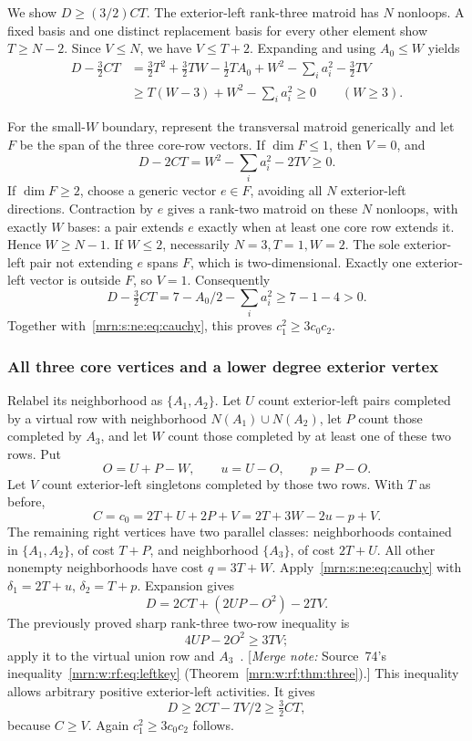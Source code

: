 \documentclass[11pt,a4paper]{article}
\theoremstyle{remark}\newtheorem{remark}[theorem]{Remark}
\newcommand{\mnote}[1]{[\textit{Merge note:} #1]}
\begin{document}
We show $D\ge(3/2)CT$. The exterior-left rank-three matroid has $N$ nonloops. A fixed basis and one distinct replacement basis for every other element show $T\ge N-2$. Since $V\le N$, we have $V\le T+2$. Expanding and using $A_0\le W$ yields
\begin{align*}
 D-\tfrac32CT
 &=\tfrac32T^2+\tfrac32TW-\tfrac12TA_0
   +W^2-\sum_i a_i^2-\tfrac32TV\\
 &\ge T(W-3)+W^2-\sum_i a_i^2\ge0
 \qquad(W\ge3).
\end{align*}

For the small-$W$ boundary, represent the transversal matroid generically and let $F$ be the span of the three core-row vectors. If $\dim F\le1$, then $V=0$, and
\[
 D-2CT=W^2-\sum_i a_i^2-2TV\ge0.
\]
If $\dim F\ge2$, choose a generic vector $e\in F$, avoiding all $N$ exterior-left directions. Contraction by $e$ gives a rank-two matroid on these $N$ nonloops, with exactly $W$ bases: a pair extends $e$ exactly when at least one core row extends it. Hence $W\ge N-1$. If $W\le2$, necessarily $N=3,T=1,W=2$. The sole exterior-left pair not extending $e$ spans $F$, which is two-dimensional. Exactly one exterior-left vector is outside $F$, so $V=1$. Consequently
\[
 D-\tfrac32CT=7-A_0/2-\sum_i a_i^2\ge7-1-4>0.
\]
Together with~\eqref{mrn:s:ne:eq:cauchy}, this proves $c_1^2\ge3c_0c_2$.

\subsubsection{All three core vertices and a lower degree exterior vertex}
Relabel its neighborhood as $\{A_1,A_2\}$. Let $U$ count exterior-left pairs completed by a virtual row with neighborhood $N(A_1)\cup N(A_2)$, let $P$ count those completed by $A_3$, and let $W$ count those completed by at least one of these two rows. Put
\[
 O=U+P-W,\qquad u=U-O,\qquad p=P-O.
\]
Let $V$ count exterior-left singletons completed by those two rows. With $T$ as before,
\[
 C=c_0=2T+U+2P+V=2T+3W-2u-p+V.
\]
The remaining right vertices have two parallel classes: neighborhoods contained in $\{A_1,A_2\}$, of cost $T+P$, and neighborhood $\{A_3\}$, of cost $2T+U$. All other nonempty neighborhoods have cost $q=3T+W$. Apply~\eqref{mrn:s:ne:eq:cauchy} with $\delta_1=2T+u$, $\delta_2=T+p$. Expansion gives
\[
 D=2CT+(2UP-O^2)-2TV.
\]
The previously proved sharp rank-three two-row inequality is
\[
 4UP-2O^2\ge3TV;
\]
apply it to the virtual union row and $A_3$~\cite{b:m74}. \mnote{Source~74's inequality~\eqref{mrn:w:rf:eq:leftkey} (Theorem~\ref{mrn:w:rf:thm:three}).} This inequality allows arbitrary positive exterior-left activities. It gives
\[
 D\ge2CT-TV/2\ge\tfrac32CT,
\]
because $C\ge V$. Again $c_1^2\ge3c_0c_2$ follows.
\end{document}

